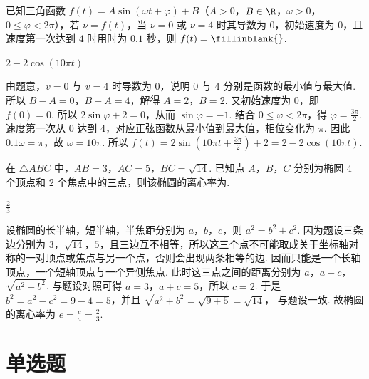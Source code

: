 \begin{problem}
已知三角函数 \( f(t)=A\sin\left( \omega t+\varphi \right)+B \)（\( A>0 \)，\( B\in \R \)，\( \omega>0 \)，\( 0\le \varphi<2\pi \)），若 \( \nu=f(t) \)，当 \( \nu=0 \) 或 \( \nu=4 \) 时其导数为 \( 0 \)，初始速度为 \( 0 \)，且速度第一次达到 \( 4 \) 时用时为 \( 0.1 \) 秒，则 \( f(t)=\fillinblank{} \).
\end{problem}

\begin{answer}
\(2-2\cos\left( 10\pi t \right)\)
\end{answer}

\begin{solution}
由题意，\( v=0 \) 与 \( v=4 \) 时导数为 \( 0 \)，说明 \( 0 \) 与 \( 4 \) 分别是函数的最小值与最大值. 所以 \( B-A=0 \)，\( B+A=4 \)，解得 \( A=2 \)，\( B=2 \).
又初始速度为 \( 0 \)，即 \( f(0)=0 \). 所以 \( 2\sin \varphi+2=0 \)，从而 \( \sin \varphi=-1 \). 结合 \( 0\le \varphi<2\pi \)，得 \( \varphi=\frac{3\pi}{2} \).
速度第一次从 \( 0 \) 达到 \( 4 \)，对应正弦函数从最小值到最大值，相位变化为 \( \pi \). 因此 \( 0.1\omega=\pi \)，故 \( \omega=10\pi \).
所以 \( f(t)=2\sin\left( 10\pi t+\frac{3\pi}{2} \right)+2=2-2\cos\left( 10\pi t \right) \).
\end{solution}

\begin{problem}
在 \( \triangle ABC \) 中，\( AB=3 \)，\( AC=5 \)，\( BC=\sqrt{14} \). 已知点 \(A\)，\(B\)，\(C\) 分别为椭圆 \( 4 \) 个顶点和 \( 2 \) 个焦点中的三点，则该椭圆的离心率为\fillinblank{}.
\end{problem}

\begin{answer}
\(\frac{2}{3}\)
\end{answer}

\begin{solution}
设椭圆的长半轴，短半轴，半焦距分别为 \( a \)，\( b \)，\( c \)，则 \( a^2=b^2+c^2 \).
因为题设三条边分别为 \( 3 \)，\( \sqrt{14} \)，\( 5 \)，且三边互不相等，所以这三个点不可能取成关于坐标轴对称的一对顶点或焦点与另一个点，否则会出现两条相等的边. 因而只能是一个长轴顶点，一个短轴顶点与一个异侧焦点.
此时这三点之间的距离分别为 \( a \)，\( a+c \)，\( \sqrt{a^2+b^2} \). 与题设对照可得 \( a=3 \)，\( a+c=5 \)，所以 \( c=2 \). 于是 \( b^2=a^2-c^2=9-4=5 \)，并且 \( \sqrt{a^2+b^2}=\sqrt{9+5}=\sqrt{14} \)，
与题设一致.
故椭圆的离心率为 \( e=\frac{c}{a}=\frac{2}{3} \).
\end{solution}
\section{单选题}

